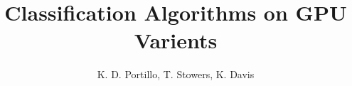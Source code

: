 \documentclass{IEEEtran}
\begin{document}
 
\title{Classification Algorithms on GPU Varients}
\author{K. D. Portillo, T. Stowers, K. Davis}
\maketitle

\end{document}
